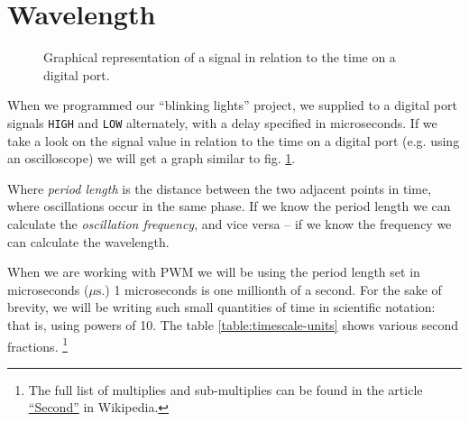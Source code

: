 \documentclass[../sparc.tex]{subfiles}
\begin{document}
\section{Wavelength}

\begin{figure}[ht]
  \caption{Graphical representation of a signal in relation to the time on a
    digital port.}
  \label{fig:blinking-led-graph}
\end{figure}

When we programmed our ``blinking lights'' project, we supplied to a digital
port signals \texttt{HIGH} and \texttt{LOW} alternately, with a delay specified
in microseconds.  If we take a look on the signal value in relation to the time
on a digital port (e.g. using an oscilloscope) we will get a graph similar to
fig. \ref{fig:blinking-led-graph}.

Where \emph{period length} is the distance between the two adjacent points in
time, where oscillations occur in the same phase.  If we know the period length
we can calculate the \emph{oscillation frequency}, and vice versa -- if we know
the frequency we can calculate the wavelength.

When we are working with \gls{PWM} we will be using the period length set in
microseconds ($\mu\mbox{s}$.)  1 microseconds is one millionth of a second.  For
the sake of brevity, we will be writing such small quantities of time in
scientific notation: that is, using powers of 10.  The table
\ref{table:timescale-units} shows various second fractions.  \footnote{The full
list of multiplies and sub-multiplies can be found in the article
\href{https://en.wikipedia.org/wiki/Second}{``Second''} in Wikipedia.}
\end{document}
